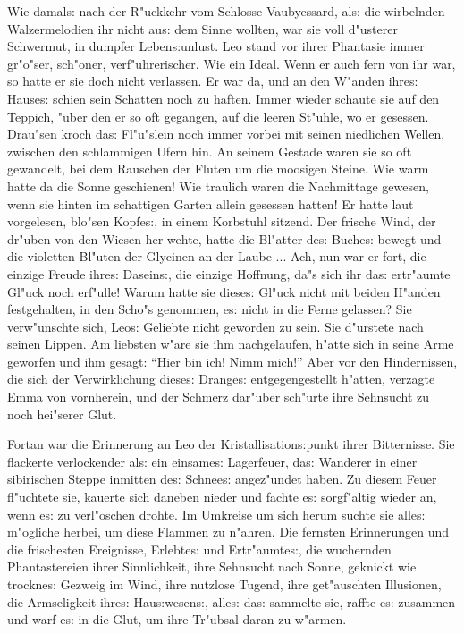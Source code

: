 \documentclass[oneside,12pt]{book}
\newcommand{\s}{s:}%
\begin{document}
Wie damal{\s} nach der R"uckkehr vom Schlosse Vaubyessard, al{\s}
die wirbelnden Walzermelodien ihr nicht au{\s} dem Sinne wollten,
war sie voll d"usterer Schwermut, in dumpfer Leben{\s}unlust. Leo
stand vor ihrer Phantasie immer gr"o"ser, sch"oner,
verf"uhrerischer. Wie ein Ideal. Wenn er auch fern von ihr war, so
hatte er sie doch nicht verlassen. Er war da, und an den W"anden
ihre{\s} Hause{\s} schien sein Schatten noch zu haften. Immer
wieder schaute sie auf den Teppich, "uber den er so oft gegangen,
auf die leeren St"uhle, wo er gesessen. Drau"sen kroch da{\s}
Fl"u"slein noch immer vorbei mit seinen niedlichen Wellen,
zwischen den schlammigen Ufern hin. An seinem Gestade waren sie so
oft gewandelt, bei dem Rauschen der Fluten um die moosigen Steine.
Wie warm hatte da die Sonne geschienen! Wie traulich waren die
Nachmittage gewesen, wenn sie hinten im schattigen Garten allein
gesessen hatten! Er hatte laut vorgelesen, blo"sen Kopfe{\s}, in
einem Korbstuhl sitzend. Der frische Wind, der dr"uben von den
Wiesen her wehte, hatte die Bl"atter de{\s} Buche{\s} bewegt und
die violetten Bl"uten der Glycinen an der Laube ... Ach, nun war
er fort, die einzige Freude ihre{\s} Dasein{\s}, die einzige
Hoffnung, da"s sich ihr da{\s} ertr"aumte Gl"uck noch erf"ulle!
Warum hatte sie diese{\s} Gl"uck nicht mit beiden H"anden
festgehalten, in den Scho"s genommen, e{\s} nicht in die Ferne
gelassen? Sie verw"unschte sich, Leo{\s} Geliebte nicht geworden
zu sein. Sie d"urstete nach seinen Lippen. Am liebsten w"are sie
ihm nachgelaufen, h"atte sich in seine Arme geworfen und ihm
gesagt: "`Hier bin ich! Nimm mich!"' Aber vor den Hindernissen,
die sich der Verwirklichung diese{\s} Drange{\s} entgegengestellt
h"atten, verzagte Emma von vornherein, und der Schmerz dar"uber
sch"urte ihre Sehnsucht zu noch hei"serer Glut.

Fortan war die Erinnerung an Leo der Kristallisation{\s}punkt
ihrer Bitternisse. Sie flackerte verlockender al{\s} ein
einsame{\s} Lagerfeuer, da{\s} Wanderer in einer sibirischen
Steppe inmitten de{\s} Schnee{\s} angez"undet haben. Zu diesem
Feuer fl"uchtete sie, kauerte sich daneben nieder und fachte e{\s}
sorgf"altig wieder an, wenn e{\s} zu verl"oschen drohte. Im
Umkreise um sich herum suchte sie alle{\s} m"ogliche herbei, um
diese Flammen zu n"ahren. Die fernsten Erinnerungen und die
frischesten Ereignisse, Erlebte{\s} und Ertr"aumte{\s}, die
wuchernden Phantastereien ihrer Sinnlichkeit, ihre Sehnsucht nach
Sonne, geknickt wie trockne{\s} Gezweig im Wind, ihre nutzlose
Tugend, ihre get"auschten Illusionen, die Armseligkeit ihre{\s}
Hau{\s}wesen{\s}, alle{\s} da{\s} sammelte sie, raffte e{\s}
zusammen und warf e{\s} in die Glut, um ihre Tr"ubsal daran zu
w"armen.
\end{document}
